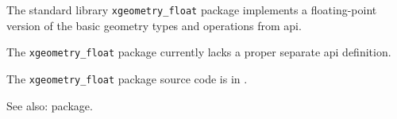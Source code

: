 
The standard library {\tt xgeometry\_float} package implements a floating-point version of the basic geometry types and operations from  api.

The {\tt xgeometry\_float} package currently lacks a proper separate api definition.

The {\tt xgeometry\_float} package source code is in .

See also:   package.
